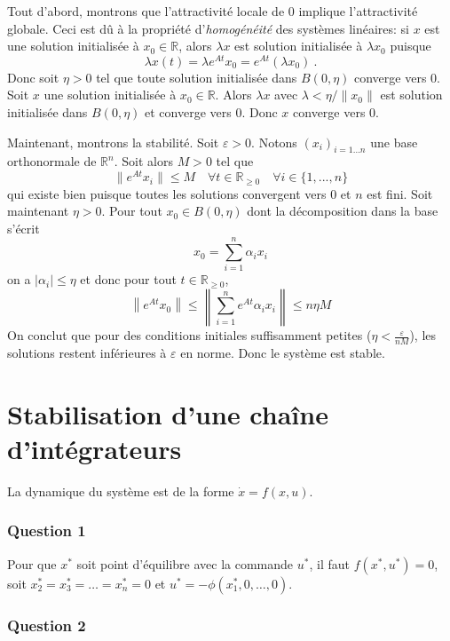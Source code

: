 Tout d'abord, montrons que l'attractivité locale de 0 implique
l'attractivité globale. Ceci est dû à la propriété d'\emph{homogénéité}
des systèmes linéaires: si \(x\) est une solution initialisée à
\(x_0\in\mathbb{R}\), alors \(\lambda x\) est solution initialisée à
\(\lambda x_0\) puisque \[
\lambda x(t) = \lambda e^{At} x_0 = e^{At} (\lambda x_0) \ .
\] Donc soit \(\eta>0\) tel que toute solution initialisée dans
\(B(0,\eta)\) converge vers 0. Soit \(x\) une solution initialisée à
\(x_0\in\mathbb{R}\). Alors \(\lambda x\) avec
\(\lambda < \eta / \|x_0\|\) est solution initialisée dans \(B(0,\eta)\)
et converge vers 0. Donc \(x\) converge vers 0.

Maintenant, montrons la stabilité. Soit \(\varepsilon >0\). Notons
\((x_i)_{i=1...n}\) une base orthonormale de \(\mathbb{R}^n\). Soit
alors \(M>0\) tel que \[
\|e^{At} x_i \| \leq M \quad \forall t \in \mathbb{R}_{\geq 0}\quad \forall i\in \{1,...,n\}
\] qui existe bien puisque toutes les solutions convergent vers 0 et
\(n\) est fini. Soit maintenant \(\eta >0\). Pour tout
\(x_0 \in B(0,\eta)\) dont la décomposition dans la base s'écrit \[
x_0 = \sum_{i=1}^n \alpha_i x_i
\] on a \(|\alpha_i|\leq \eta\) et donc pour tout
\(t \in \mathbb{R}_{\geq 0}\), \[
\left\| e^{At} x_0 \right\| \leq \left\| \sum_{i=1}^n  e^{At} \alpha_i x_i\right\|  \leq  n \eta M
\] On conclut que pour des conditions initiales suffisamment petites
(\(\eta <\frac{\varepsilon}{nM}\)), les solutions restent inférieures à
\(\varepsilon\) en norme. Donc le système est stable.

\hypertarget{correc_cont_lin}{%
\section{Stabilisation d'une chaîne
d'intégrateurs}\label{correc_cont_lin}}

La dynamique du système est de la forme \(\dot{x} = f(x,u)\).

\hypertarget{answer-cont-lin-1}{%
\subsubsection*{Question 1}\label{answer-cont-lin-1}}


Pour que \(x^*\) soit point d'équilibre avec la commande \(u^*\), il
faut \(f(x^*,u^*)=0\), soit \(x_2^*=x_3^*=\ldots=x_n^*=0\) et
\(u^* = -\phi(x_1^*,0,\ldots,0)\).

\hypertarget{answer-cont-lin-2}{%
\subsubsection*{Question 2}\label{answer-cont-lin-2}}

